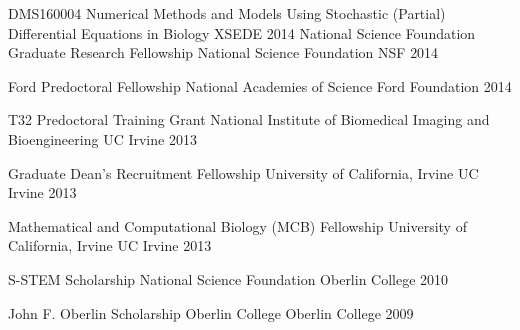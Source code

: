 



\begin{cvhonors}
	\cvhonor
	{DMS160004} %
	{Numerical Methods and Models Using Stochastic (Partial) Differential Equations in Biology} %
	{XSEDE} %
	{2014} %
	\cvhonor
	{National Science Foundation Graduate Research Fellowship  } %
	{National Science Foundation} %
	{NSF} %
	{2014} %
	
\cvhonor
	{Ford Predoctoral Fellowship} %
	{National Academies of Science} %
	{Ford Foundation} %
	{2014} %
	
\cvhonor
	{T32 Predoctoral Training Grant} %
	{National Institute of Biomedical Imaging and Bioengineering} %
	{UC Irvine} %
	{2013} %

  \cvhonor
    {Graduate Dean’s Recruitment Fellowship} %
    {University of California, Irvine} %
    {UC Irvine} %
    {2013} %

  \cvhonor
    {Mathematical and Computational Biology (MCB) Fellowship} %
    {University of California, Irvine} %
    {UC Irvine} %
    {2013} %

  \cvhonor
    {S-STEM Scholarship} %
    {National Science Foundation} %
    {Oberlin College} %
    {2010} %

  \cvhonor
    {John F. Oberlin Scholarship} %
    {Oberlin College} %
    {Oberlin College} %
    {2009} %

\end{cvhonors}


